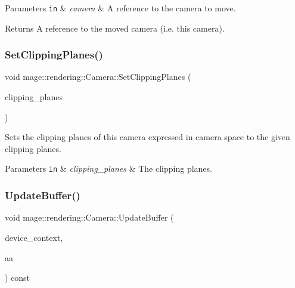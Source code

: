 \begin{DoxyParams}[1]{Parameters}
\mbox{\tt in}  & {\em camera} & A reference to the camera to move. \\
\hline
\end{DoxyParams}
\begin{DoxyReturn}{Returns}
A reference to the moved camera (i.\+e. this camera). 
\end{DoxyReturn}
\mbox{\label{classmage_1_1rendering_1_1_camera_afc95f8de701649af5b614a57c1c06e9a}} 
\subsubsection{\texorpdfstring{Set\+Clipping\+Planes()}{SetClippingPlanes()}}
{\footnotesize\ttfamily void mage\+::rendering\+::\+Camera\+::\+Set\+Clipping\+Planes (\begin{DoxyParamCaption}\item[{\mbox{\hyperlink{namespacemage_aee4759dedc8def6c6dec26b5c7eddf29}{F32x2}}}]{clipping\+\_\+planes }\end{DoxyParamCaption})\hspace{0.3cm}{\ttfamily [noexcept]}}

Sets the clipping planes of this camera expressed in camera space to the given clipping planes.


\begin{DoxyParams}[1]{Parameters}
\mbox{\tt in}  & {\em clipping\+\_\+planes} & The clipping planes. \\
\hline
\end{DoxyParams}
\mbox{\label{classmage_1_1rendering_1_1_camera_a82380790ba5c92b93e90c8b8cea146c0}} 
\subsubsection{\texorpdfstring{Update\+Buffer()}{UpdateBuffer()}}
{\footnotesize\ttfamily void mage\+::rendering\+::\+Camera\+::\+Update\+Buffer (\begin{DoxyParamCaption}\item[{I\+D3\+D11\+Device\+Context \&}]{device\+\_\+context,  }\item[{\mbox{\hyperlink{namespacemage_1_1rendering_ac3f75e49e92b42f2f5fb55c450d8899c}{Anti\+Aliasing}}}]{aa }\end{DoxyParamCaption}) const}


